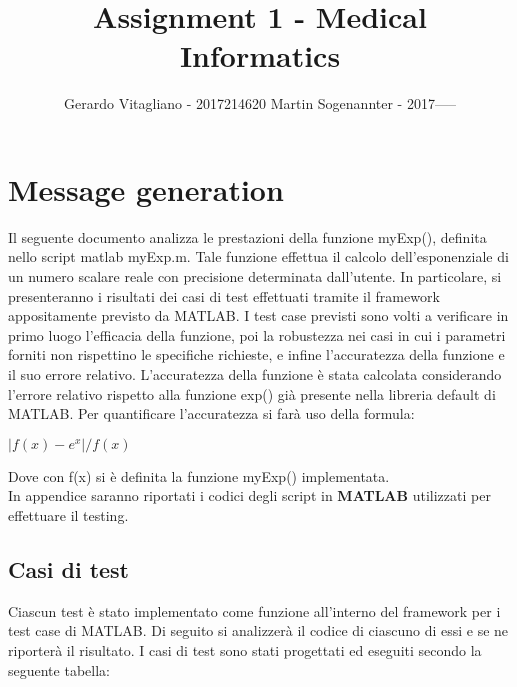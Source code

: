 \documentclass[a4paper,titlepage]{article}
\newcommand{\subtitle}[1]{%
  \posttitle{%
    \par\end{center}
    \begin{center}\large#1\end{center}
    \vskip0.5em}%
}
\begin{document}
\title{Assignment 1 - Medical Informatics}
\subtitle{Clinical message parsing}
\author{Gerardo Vitagliano - 2017214620
		Martin Sogenannter - 2017-----}
\date{\vspace{-5ex}}
\vfill
\maketitle
\clearpage
\section{Message generation}

          Il seguente documento analizza le prestazioni della funzione myExp(), definita nello script matlab myExp.m. Tale funzione effettua il calcolo
		  dell'esponenziale di un numero scalare reale con precisione determinata dall'utente.
		  In particolare, si presenteranno i risultati dei casi di test effettuati tramite il framework appositamente previsto da MATLAB.
		  I test case previsti sono volti a verificare in primo luogo l'efficacia della funzione, poi la robustezza nei casi in cui i parametri forniti
		  non rispettino le specifiche richieste, e infine l'accuratezza della funzione e il suo errore relativo.
		  		 L'accuratezza della funzione è stata calcolata considerando l'errore relativo rispetto alla funzione exp() già presente nella libreria default di MATLAB.
		 Per quantificare l'accuratezza si farà uso della formula:\\
			\centerline{$|f(x)-e^x|/f(x)$}
		 Dove con f(x) si è definita la funzione myExp() implementata.\\
		In appendice saranno riportati i codici degli script in \textbf{MATLAB} utilizzati per effettuare il testing.

		\subsection{Casi di test}
		Ciascun test è stato implementato come funzione all'interno del framework per i test case di MATLAB.
		Di seguito si analizzerà il codice di ciascuno di essi e se ne riporterà il risultato.
		I casi di test sono stati progettati ed eseguiti secondo la seguente tabella:
\end{document}

